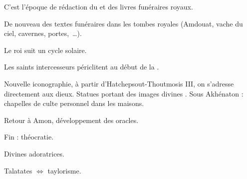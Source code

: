 C'est l'époque de rédaction du \LM et des livres funéraires royaux.

De nouveau des textes funéraires dans les tombes royales (Amdouat, 
vache du ciel, cavernes, portes,~\dots).

Le roi suit un cycle solaire.

Les saints intercesseurs périclitent au début de la .

Nouvelle iconographie, à partir d'Hatchepsout-Thoutmosis III, on 
s'adresse directement aux dieux.
Statues portant des images divines \donc{} .
Sous Akhénaton : chapelles de culte personnel dans les maisons.

Retour à Amon, développement des oracles.

Fin \NK : théocratie.

Divines adoratrices.

Talatates $\Longleftrightarrow$ taylorisme.

